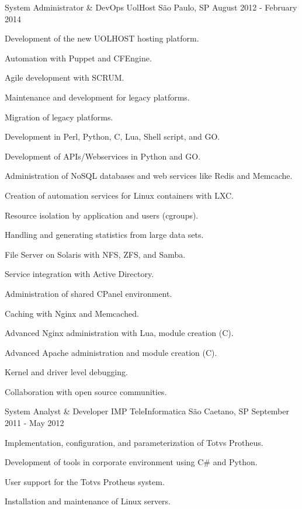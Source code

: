 \begin{cventries}
\cventry
{System Administrator \& DevOps} %
{UolHost} %
{São Paulo, SP} %
{August 2012 - February 2014} %
{
  \begin{cvitems} %
      \item {Development of the new UOLHOST hosting platform.}
      \item {Automation with Puppet and CFEngine.}
      \item {Agile development with SCRUM.}
      \item {Maintenance and development for legacy platforms.}
      \item {Migration of legacy platforms.}
      \item {Development in Perl, Python, C, Lua, Shell script, and GO.}
      \item {Development of APIs/Webservices in Python and GO.}
      \item {Administration of NoSQL databases and web services like Redis and Memcache.}
      \item {Creation of automation services for Linux containers with LXC.}
      \item {Resource isolation by application and users (cgroups).}
      \item {Handling and generating statistics from large data sets.}
      \item {File Server on Solaris with NFS, ZFS, and Samba.}
      \item {Service integration with Active Directory.}
      \item {Administration of shared CPanel environment.}
      \item {Caching with Nginx and Memcached.}
      \item {Advanced Nginx administration with Lua, module creation (C).}
      \item {Advanced Apache administration and module creation (C).}
      \item {Kernel and driver level debugging.}
      \item {Collaboration with open source communities.}
  \end{cvitems}
}

\cventry
{System Analyst \& Developer} %
{IMP TeleInformatica} %
{São Caetano, SP} %
{September 2011 - May 2012} %
{
\begin{cvitems} %
    \item {Implementation, configuration, and parameterization of Totvs Protheus.}
    \item {Development of tools in corporate environment using C\# and Python.}
    \item {User support for the Totvs Protheus system.}
    \item {Installation and maintenance of Linux servers.}
\end{cvitems}
}


\end{cventries}
